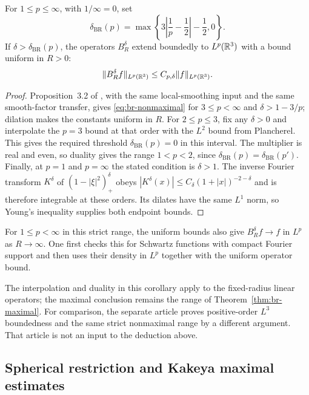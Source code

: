 \begin{corollary}
\label{cor:br-nonmaximal}
For $1\le p\le\infty$, with $1/\infty=0$, set
\[
 \delta_{\mathrm{BR}}(p)
 =\max\left\{3\left|\frac1p-\frac12\right|-\frac12,0\right\}.
\]
If $\delta>\delta_{\mathrm{BR}}(p)$, the operators $B_R^\delta$
extend boundedly to $L^p(\mathbb R^3)$ with a bound uniform in $R>0$:
\begin{equation}\label{eq:br-nonmaximal}
 \lVert B_R^\delta f\rVert_{L^p(\mathbb R^3)}
 \le C_{p,\delta}\lVert f\rVert_{L^p(\mathbb R^3)}.
\end{equation}
\end{corollary}

\begin{proof}
Proposition~3.2 of \cite{BeltranHickmanSogge2019Survey}, with the same
local-smoothing input and the same smooth-factor transfer, gives
\eqref{eq:br-nonmaximal} for $3\le p<\infty$ and
$\delta>1-3/p$; dilation makes the constants uniform in $R$.
For $2\le p\le3$, fix any $\delta>0$ and interpolate the $p=3$
bound at that order with the $L^2$ bound from Plancherel. This gives
the required threshold $\delta_{\mathrm{BR}}(p)=0$ in this interval.
The multiplier is real and even, so duality gives the range
$1<p<2$, since $\delta_{\mathrm{BR}}(p)=\delta_{\mathrm{BR}}(p')$.
Finally, at $p=1$ and $p=\infty$ the stated condition is $\delta>1$.
The inverse Fourier transform $K^\delta$ of $(1-|\xi|^2)_+^\delta$ obeys
$|K^\delta(x)|\le C_\delta(1+|x|)^{-2-\delta}$ and is therefore
integrable at these orders. Its dilates have the same $L^1$ norm,
so Young's inequality supplies both endpoint bounds.
\end{proof}

For $1\le p<\infty$ in this strict range, the uniform bounds also give
$B_R^\delta f\to f$ in $L^p$ as $R\to\infty$. One first checks
this for Schwartz functions with compact Fourier support and then
uses their density in $L^p$ together with the uniform operator bound.

The interpolation and duality in this corollary apply to the
fixed-radius linear operators; the maximal conclusion remains the
range of Theorem~\ref{thm:br-maximal}. For comparison, the separate
article \cite[Theorem~1.1 and Corollary~12.4]{OpenAIBochnerRiesz2026}
proves positive-order $L^3$ boundedness and the same strict nonmaximal
range by a different argument. That article is not an input to the
deduction above.

\subsection{Spherical restriction and Kakeya maximal estimates}
\label{subsec:restriction-kakeya}

